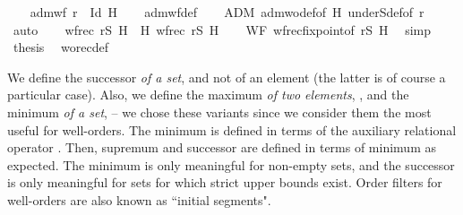 \begin{isabellebody}
\ \ \isamarkupfalse%
\ {\isachardoublequoteopen}adm{\isacharunderscore}{\kern0pt}wf\ {\isacharparenleft}{\kern0pt}r\ {\isacharminus}{\kern0pt}\ Id{\isacharparenright}{\kern0pt}\ H{\isachardoublequoteclose}\isanewline
\ \ \isamarkupfalse%
\ adm{\isacharunderscore}{\kern0pt}wf{\isacharunderscore}{\kern0pt}def\isanewline
\ \ \isamarkupfalse%
\ ADM\ adm{\isacharunderscore}{\kern0pt}wo{\isacharunderscore}{\kern0pt}def{\isacharbrackleft}{\kern0pt}of\ H{\isacharbrackright}{\kern0pt}\ underS{\isacharunderscore}{\kern0pt}def{\isacharbrackleft}{\kern0pt}of\ r{\isacharbrackright}{\kern0pt}\ \isamarkupfalse%
\ auto\isanewline
\ \ \isamarkupfalse%
\ {\isachardoublequoteopen}wfrec\ {\isacharquery}{\kern0pt}rS\ H\ {\isacharequal}{\kern0pt}\ H\ {\isacharparenleft}{\kern0pt}wfrec\ {\isacharquery}{\kern0pt}rS\ H{\isacharparenright}{\kern0pt}{\isachardoublequoteclose}\isanewline
\ \ \isamarkupfalse%
\ WF\ wfrec{\isacharunderscore}{\kern0pt}fixpoint{\isacharbrackleft}{\kern0pt}of\ {\isacharquery}{\kern0pt}rS\ H{\isacharbrackright}{\kern0pt}\ \isamarkupfalse%
\ simp\isanewline
\ \ \isamarkupfalse%
\ {\isacharquery}{\kern0pt}thesis\ \isamarkupfalse%
\ worec{\isacharunderscore}{\kern0pt}def\ \isacommand{{\isachardot}{\kern0pt}}\isamarkupfalse%
\isanewline
{}\isamarkupfalse%
%
\endisatagproof
{\isafoldproof}%
%
\isadelimproof
%
\endisadelimproof
%
\isadelimdocument
%
\endisadelimdocument
%
\isatagdocument
%
\isamarkuptrue%
%
\endisatagdocument
{\isafolddocument}%
%
\isadelimdocument
%
\endisadelimdocument
%
\begin{isamarkuptext}%
We define the successor {\em of a set}, and not of an element (the latter is of course
a particular case).  Also, we define the maximum {\em of two elements}, ,
and the minimum {\em of a set},  -- we chose these variants since we
consider them the most useful for well-orders.  The minimum is defined in terms of the
auxiliary relational operator .  Then, supremum and successor are
defined in terms of minimum as expected.
The minimum is only meaningful for non-empty sets, and the successor is only
meaningful for sets for which strict upper bounds exist.
Order filters for well-orders are also known as ``initial segments".%
\end{isamarkuptext}\isamarkuptrue%
\isamarkupfalse%

\end{isabellebody}
